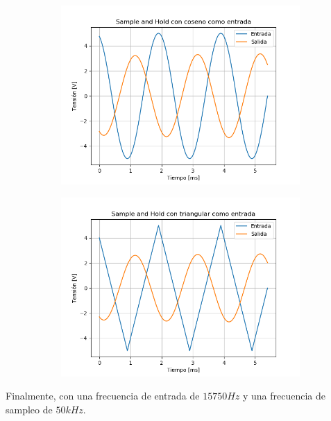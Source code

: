 \begin{figure}[H]
	\begin{subfigure}{.5\textwidth}
	\centering
	\includegraphics[width=\textwidth]{ImagenesEjercicio6/puntob1/SH - Cos.png}
	\end{subfigure}
	\begin{subfigure}{.5\textwidth}
	\centering
	\includegraphics[width=\textwidth]{ImagenesEjercicio6/puntob1/SH - Tri.png}
	\end{subfigure}
\end{figure}

Finalmente, con una frecuencia de entrada de $15750Hz$ y una frecuencia de sampleo de $50kHz$.

